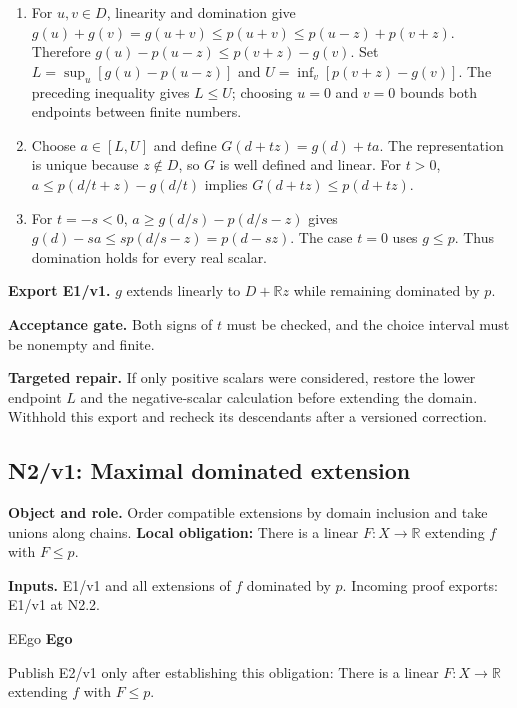\documentclass[preprint,12pt,aps,pra,showkeys,amsmath,amssymb,superscriptaddress,floatfix]{revtex4-2}
\theoremstyle{definition}
\theoremstyle{remark}
\newcommand{\mmfaculty}[3]{%
 \begin{mmfacultybox}{#1}{#2}
 {\sffamily\bfseries\color{MMBlue}#2}\par\smallskip #3
 \end{mmfacultybox}}
\newcommand{\field}[2]{\par\smallskip\noindent\textbf{#1.} #2\par}
\begin{document}
\begin{enumerate}[label=N1.\arabic*,leftmargin=3.4em]

\item For \(u,v\in D\), linearity and domination give
\(g(u)+g(v)=g(u+v)\le p(u+v)\le p(u-z)+p(v+z)\). Therefore
\(g(u)-p(u-z)\le p(v+z)-g(v)\). Set \(L=\sup_u[g(u)-p(u-z)]\) and
\(U=\inf_v[p(v+z)-g(v)]\). The preceding inequality gives \(L\le U\);
choosing \(u=0\) and \(v=0\) bounds both endpoints between finite
numbers.

\item Choose \(a\in[L,U]\) and define \(G(d+tz)=g(d)+ta\). The representation
is unique because \(z\notin D\), so \(G\) is well defined and linear.
For \(t>0\), \(a\le p(d/t+z)-g(d/t)\) implies \(G(d+tz)\le p(d+tz)\).

\item For \(t=-s<0\), \(a\ge g(d/s)-p(d/s-z)\) gives
\(g(d)-sa\le s p(d/s-z)=p(d-sz)\). The case \(t=0\) uses \(g\le p\).
Thus domination holds for every real scalar.

\end{enumerate}

\field{Export E1/v1}{\(g\) extends linearly to \(D+\mathbb Rz\) while remaining dominated by
\(p\).}

\field{Acceptance gate}{Both signs of \(t\) must be checked, and the choice interval must be
nonempty and finite.}

\field{Targeted repair}{If only positive scalars were considered, restore the lower endpoint
\(L\) and the negative-scalar calculation before extending the domain.
Withhold this export and recheck its descendants after a versioned
correction.}

\endgroup

\clearpage

\subsection{N2/v1: Maximal dominated extension}

\field{Object and role}{Order compatible extensions by domain inclusion and take unions along
chains. \textbf{Local obligation:} There is a linear \(F:X\to\mathbb R\)
extending \(f\) with \(F\le p\).}

\field{Inputs}{E1/v1 and all extensions of \(f\) dominated by \(p\). Incoming proof
exports: E1/v1 at N2.2.}

\mmfaculty{E}{Ego}{Publish E2/v1 only after establishing this obligation: There is a linear
\(F:X\to\mathbb R\) extending \(f\) with \(F\le p\).}
\end{document}
